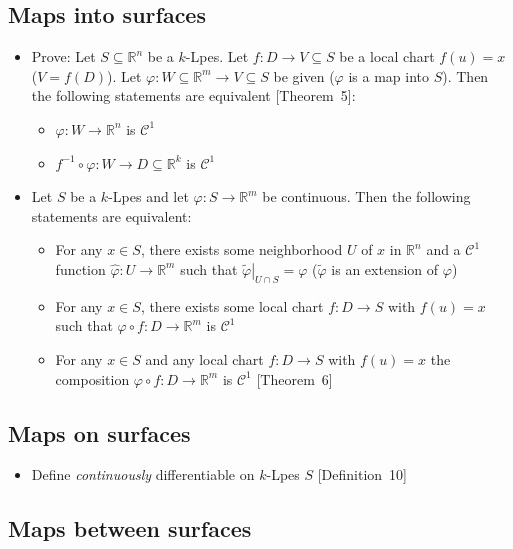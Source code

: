 \documentclass{article}
\numberwithin{lecref}{section}
\begin{document}
\subsection*{Maps into surfaces}

\begin{itemize}
  \item Prove: Let $S \subseteq \mathbb R^n$ be a $k$-Lpes. Let $f: D \to V \subseteq S$ be a local chart $f(u) = x$ ($V = f(D)$). Let $\varphi: W \subseteq \mathbb R^m \to V \subseteq S$ be given ($\varphi$ is a map into $S$). Then the following statements are equivalent [Theorem~5]:
    \begin{itemize}
      \item $\varphi: W \to \mathbb R^n$ is $\mathcal C^1$
      \item $f^{-1} \circ \varphi: W \to D \subseteq \mathbb R^k$ is $\mathcal C^1$
    \end{itemize}
  \item Let $S$ be a $k$-Lpes and let $\varphi: S \to \mathbb R^m$ be continuous.
    Then the following statements are equivalent:
    \begin{itemize}
      \item For any $x \in S$, there exists some neighborhood $U$ of $x$ in $\mathbb R^n$ and a $\mathcal C^1$ function $\hat{\varphi}: U \to \mathbb R^m$ such that $\left.\tilde \varphi\right|_{U \cap S} = \varphi$ ($\tilde\varphi$ is an extension of $\varphi$)
      \item For any $x \in S$, there exists some local chart $f: D \to S$ with $f(u) = x$ such that $\varphi \circ f: D \to \mathbb R^m$ is $\mathcal C^1$
      \item For any $x \in S$ and any local chart $f: D \to S$ with $f(u) = x$ the composition $\varphi \circ f: D \to \mathbb R^m$ is $\mathcal C^1$ [Theorem~6]
    \end{itemize}
\end{itemize}

\subsection*{Maps on surfaces}

\begin{itemize}
  \item Define \emph{continuously} differentiable on $k$-Lpes $S$ [Definition~10]
\end{itemize}

\subsection*{Maps between surfaces}
\end{document}

